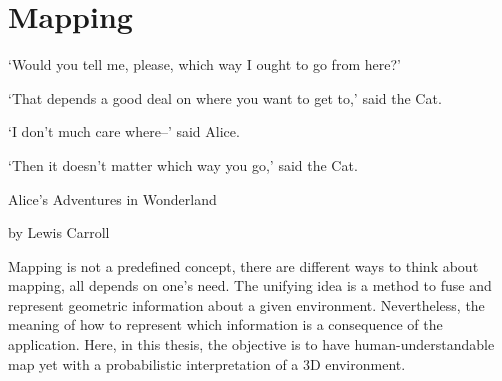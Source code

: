 
\chapter{Mapping}

\renewcommand{\epigraphsize}{\footnotesize}
\epigraph{`Would you tell me, please, which way I ought to go from here?'

  `That depends a good deal on where you want to get to,' said the Cat.

  `I don't much care where--' said Alice.

  `Then it doesn't matter which way you go,' said the Cat. }{Alice's Adventures
  in Wonderland

  by Lewis Carroll}
  
Mapping is not a predefined concept, there are different ways to think about
mapping, all depends on one's need. The unifying idea is a method to fuse and
represent geometric information about a given environment. Nevertheless, the
meaning of how to represent which information is a consequence of the
application. Here, in this thesis, the objective is to have human-understandable
map yet with a probabilistic interpretation of a 3D environment. 







